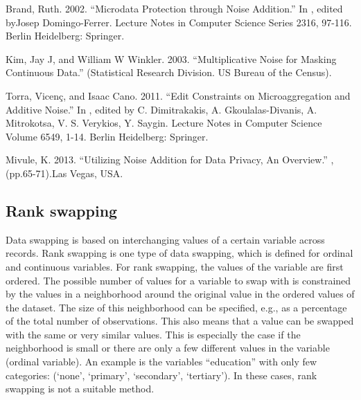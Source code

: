 \documentclass[letterpaper,10pt,english]{sphinxmanual}
\begin{document}

Brand, Ruth. 2002. “Microdata Protection through Noise Addition.” In
,
edited byJosep Domingo-Ferrer. Lecture Notes in Computer Science Series
2316, 97-116. Berlin Heidelberg: Springer.

Kim, Jay J, and William W Winkler. 2003. “Multiplicative Noise for
Masking Continuous Data.”  (Statistical Research
Division. US Bureau of the Census).

Torra, Vicenç, and Isaac Cano. 2011. “Edit Constraints on
Microaggregation and Additive Noise.” In , edited by C. Dimitrakakis, A.
Gkoulalas-Divanis, A. Mitrokotsa, V. S. Verykios, Y. Saygin. Lecture
Notes in Computer Science Volume 6549, 1-14. Berlin Heidelberg:
Springer. 

Mivule, K. 2013. “Utilizing Noise Addition for Data Privacy, An
Overview.” , (pp.65-71).Las Vegas, USA.


\subsection{Rank swapping}
\label{\detokenize{anon_methods:rank-swapping}}
Data swapping is based on interchanging values of a certain variable
across records. Rank swapping is one type of data swapping, which is
defined for ordinal and continuous variables. For rank swapping, the
values of the variable are first ordered. The possible number of values
for a variable to swap with is constrained by the values in a
neighborhood around the original value in the ordered values of the
dataset. The size of this neighborhood can be specified, e.g., as a
percentage of the total number of observations. This also means that a
value can be swapped with the same or very similar values. This is
especially the case if the neighborhood is small or there are only a few
different values in the variable (ordinal variable). An example is the
variables “education” with only few categories: (‘none’, ‘primary’,
‘secondary’, ‘tertiary’). In these cases, rank swapping is not a
suitable method.
\end{document}

